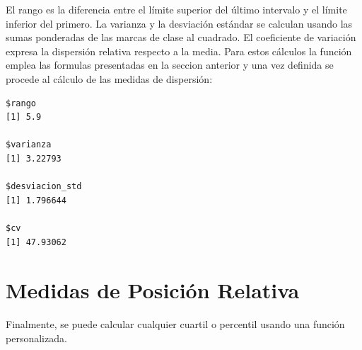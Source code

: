\documentclass[
  spanish,
  letterpaper,
]{book}
\newenvironment{Shaded}{\begin{snugshade}}{\end{snugshade}}
\newcommand{\CommentTok}[1]{\textcolor[rgb]{0.37,0.37,0.37}{#1}}
\newcommand{\FunctionTok}[1]{\textcolor[rgb]{0.28,0.35,0.67}{#1}}
\newcommand{\NormalTok}[1]{\textcolor[rgb]{0.00,0.23,0.31}{#1}}
\newcommand{\OtherTok}[1]{\textcolor[rgb]{0.00,0.23,0.31}{#1}}
\newcommand{\SpecialCharTok}[1]{\textcolor[rgb]{0.37,0.37,0.37}{#1}}
\begin{document}
El rango es la diferencia entre el límite superior del último intervalo
y el límite inferior del primero. La varianza y la desviación estándar
se calculan usando las sumas ponderadas de las marcas de clase al
cuadrado. El coeficiente de variación expresa la dispersión relativa
respecto a la media. Para estos cálculos la función emplea las formulas
presentadas en la seccion anterior y una vez definida se procede al
cálculo de las medidas de dispersión:

\begin{Shaded}
\end{Shaded}

\begin{verbatim}
$rango
[1] 5.9

$varianza
[1] 3.22793

$desviacion_std
[1] 1.796644

$cv
[1] 47.93062
\end{verbatim}

\section{Medidas de Posición
Relativa}\label{medidas-de-posiciuxf3n-relativa-3}

Finalmente, se puede calcular cualquier cuartil o percentil usando una
función personalizada.
\end{document}
